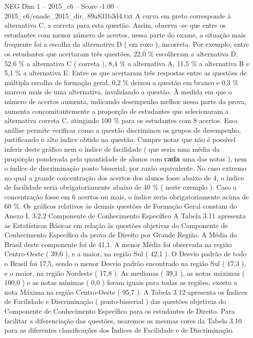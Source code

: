 \begin{textsample}{NEG Dim 1 – 2015\_c6 – Score -1.00 – 2015\_c6/enade\_2015\_dir\_89a831b3d4.txt}
A curva em preto corresponde à alternativa C, a correta para esta questão.
Assim, observa -se que entre os estudantes com menor número de acertos, nessa parte do exame, a situação mais frequente foi a escolha da alternativa D ( em roxo ), incorreta.
Por exemplo, entre os estudantes que acertaram três questões, 22,0 \% escolheram a alternativa D, 52,6 \% a alternativa C ( correta ), 8,4 \% a alternativa A, 11,5 \% a alternativa B e 5,1 \% a alternativa E.
Entre os que acertaram três respostas entre as questões de múltipla escolha de formação geral, 0,2 \% deixou a questão em branco e 0,3 \% marcou mais de uma alternativa, invalidando a questão.
À medida em que o número de acertos aumenta, indicando desempenho melhor nessa parte da prova, aumenta concomitantemente a proporção de estudantes que selecionaram a alternativa correta C, atingindo 100 \% para os estudantes com 8 acertos.
Essa análise permite verificar como a questão discriminou os grupos de desempenho, justificando o alto índice obtido na questão.
Cumpre notar que não é possível inferir deste gráfico nem o índice de facilidade ( que seria uma média da proporção ponderada pela quantidade de alunos com \textbf{cada} uma das notas ), nem o índice de discriminação ponto bisserial, por razão equivalente.
No caso extremo no qual a grande concentração dos acertos dos alunos fosse abaixo de 4, o índice de facilidade seria obrigatoriamente abaixo de 40 \% ( neste exemplo ).
Caso a concentração fosse em 6 acertos ou mais, o índice seria obrigatoriamente acima de 60 \%.
Os gráficos relativos às demais questões de Formação Geral constam do Anexo I. 3.2.2 Componente de Conhecimento Específico A Tabela 3.11 apresenta as Estatísticas Básicas em relação às questões objetivas do Componente de Conhecimento Específico da prova de Direito por Grande Região.
A Média do Brasil deste componente foi de 41,1.
A menor Média foi observada na região Centro-Oeste ( 39,6 ), e a maior, na região Sul ( 42,1 ).
O Desvio padrão de todo o Brasil foi 17,5, sendo o menor Desvio padrão encontrado na região Sul ( 17,3 ), e o maior, na região Nordeste ( 17,8 ).
As medianas ( 39,1 ), as notas máximas ( 100,0 ) e as notas mínimas ( 0,0 ) foram iguais para todas as regiões, exceto a nota Máxima na região Centro-Oeste ( 95,7 ).
A Tabela 3.12 apresenta os Índices de Facilidade e Discriminação ( ponto-bisserial ) das questões objetivas do Componente de Conhecimento Específico para os estudantes de Direito.
Para facilitar a diferenciação das questões, usaremos as mesmas cores da Tabela 3.10 para as diferentes classificações dos Índices de Facilidade e de Discriminação.

\end{textsample}
